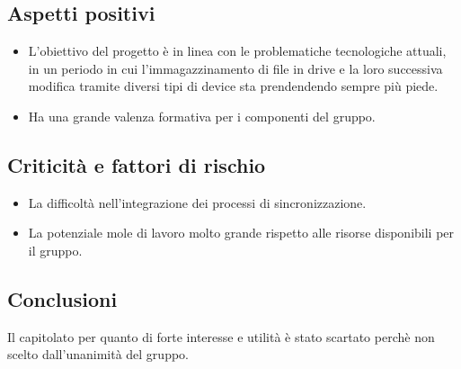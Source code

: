 \subsection{Aspetti positivi}
\begin{itemize}
    \item L'obiettivo del progetto è in linea con le problematiche tecnologiche attuali, in un periodo in cui l'immagazzinamento di file in drive e la loro successiva modifica tramite diversi tipi di device sta prendendendo sempre più piede.
    \item Ha una grande valenza formativa per i componenti del gruppo.
\end{itemize}
\subsection{Criticità e fattori di rischio}
\begin{itemize}
    \item La difficoltà nell'integrazione dei processi di sincronizzazione.
    \item La potenziale mole di lavoro molto grande rispetto alle risorse disponibili per il gruppo.
\end{itemize}
\subsection{Conclusioni}
Il capitolato per quanto di forte interesse e utilità è stato scartato perchè non scelto dall'unanimità del gruppo.
